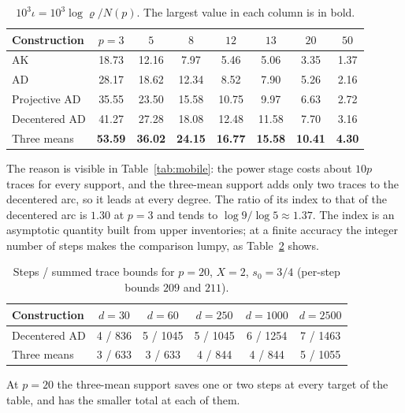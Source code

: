 \begin{table}[h]
\centering\small
\caption{$10^{3}\iota=10^{3}\log\varrho/N(p)$. The largest value in each column is in bold.}\label{tab:index}
\begin{tabular}{@{}lccccccc@{}}
\toprule
Construction & $p=3$ & $5$ & $8$ & $12$ & $13$ & $20$ & $50$\\
\midrule
AK & 18.73 & 12.16 & 7.97 & 5.46 & 5.06 & 3.35 & 1.37\\
AD & 28.17 & 18.62 & 12.34 & 8.52 & 7.90 & 5.26 & 2.16\\
Projective AD & 35.55 & 23.50 & 15.58 & 10.75 & 9.97 & 6.63 & 2.72\\
Decentered AD & 41.27 & 27.28 & 18.08 & 12.48 & 11.58 & 7.70 & 3.16\\
Three means & \textbf{53.59} & \textbf{36.02} & \textbf{24.15} & \textbf{16.77} & \textbf{15.58} & \textbf{10.41} & \textbf{4.30}\\
\bottomrule
\end{tabular}
\end{table}

The reason is visible in Table~\ref{tab:mobile}: the power stage costs about $10p$ traces for every
support, and the three-mean support adds only two traces to the decentered arc, so it leads at every
degree. The ratio of its index to that of the decentered arc is $1.30$ at $p=3$ and tends to
$\log9/\log5\approx1.37$. The index is an asymptotic
quantity built from upper inventories; at a finite accuracy the integer number of steps makes the
comparison lumpy, as Table~\ref{tab:p20} shows.

\begin{table}[h]
\centering\small
\caption{Steps / summed trace bounds for $p=20$, $X=2$, $s_0=3/4$ (per-step bounds $209$ and
$211$).}\label{tab:p20}
\begin{tabular}{@{}lccccc@{}}
\toprule
Construction & $d=30$ & $d=60$ & $d=250$ & $d=1000$ & $d=2500$\\
\midrule
Decentered AD & 4 / 836 & 5 / 1045 & 5 / 1045 & 6 / 1254 & 7 / 1463\\
Three means & 3 / 633 & 3 / 633 & 4 / 844 & 4 / 844 & 5 / 1055\\
\bottomrule
\end{tabular}
\end{table}

At $p=20$ the three-mean support saves one or two steps at every target of the table, and has the
smaller total at each of them.


